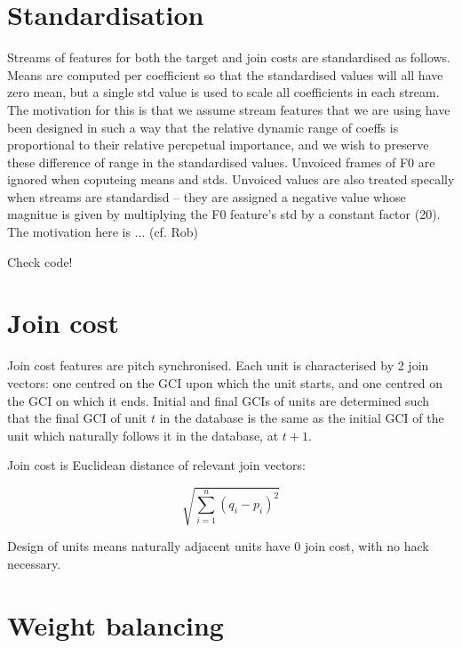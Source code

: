 
\section{Standardisation}

Streams of features for both the target and join costs are standardised as follows. Means are computed per coefficient so that the standardised values will all have zero mean, but a single std value is used to scale all coefficients in each stream. The motivation for this is that we assume stream features that we are using have been designed in such a way that the relative dynamic range of coeffs is proportional to their relative percpetual importance, and we wish to preserve these difference of range in the standardised values. Unvoiced frames of F0 are ignored when coputeing means and stds. Unvoiced values are also treated specally when streams are standardisd -- they are assigned a negative value whose magnitue is given by multiplying the F0 feature's std by a constant factor (20). The motivation here is ... (cf. Rob)

Check code!

\section{Join cost}

Join cost features are pitch synchronised. Each unit is characterised by 2 join vectors: one centred on the GCI upon which the unit starts, and one centred on the GCI on which it ends. Initial and final GCIs of units are determined such that the final GCI of unit $t$ in the database is the same as the initial GCI of the unit which naturally follows it in the database, at $t+1$.

Join cost is Euclidean distance of relevant join vectors:

\begin{equation}
\sqrt{\sum_{i=1}^{n}(q_i - p_i)^{2}}
\end{equation}

Design of units means naturally adjacent units have 0 join cost, with no hack necessary.




\section{Weight balancing}


